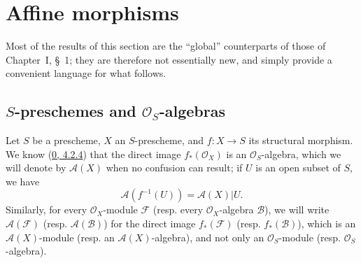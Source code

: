 \section{Affine morphisms}
\label{section:II.1}

Most of the results of this section are the ``global''
counterparts of those of Chapter~I, \S~1; they are
therefore not essentially new, and simply provide a convenient
language for what follows.

\setcounter{subsection}{0}
\subsection{$S$-preschemes and $\mathcal{O}_S$-algebras}
\label{subsection:II.1.1}

\begin{env}[1.1.1]
\label{II.1.1.1}
Let $S$ be a prescheme, $X$ an $S$-prescheme, and $f:X\to S$ its structural
morphism. We know (\hyperref[0.4.2.4]{0, 4.2.4}) that the direct image
$f_*(\mathcal{O}_X)$ is an $\mathcal{O}_S$-algebra, which we
will denote by $\mathcal{A}(X)$ when no confusion can result; if $U$
is an open subset of $S$, we have
\[
  \mathcal{A}(f^{-1}(U))=\mathcal{A}(X)|U.
\]
Similarly, for every $\mathcal{O}_X$-module $\mathcal{F}$ (resp. every
$\mathcal{O}_X$-algebra $\mathcal{B}$), we will write
$\mathcal{A}(\mathcal{F})$ (resp. $\mathcal{A}(\mathcal{B})$) for the direct
image $f_*(\mathcal{F})$ (resp. $f_*(\mathcal{B})$), which is an
$\mathcal{A}(X)$-module (resp. an $\mathcal{A}(X)$-algebra), and not only
an $\mathcal{O}_S$-module (resp. $\mathcal{O}_S$-algebra).
\end{env}

